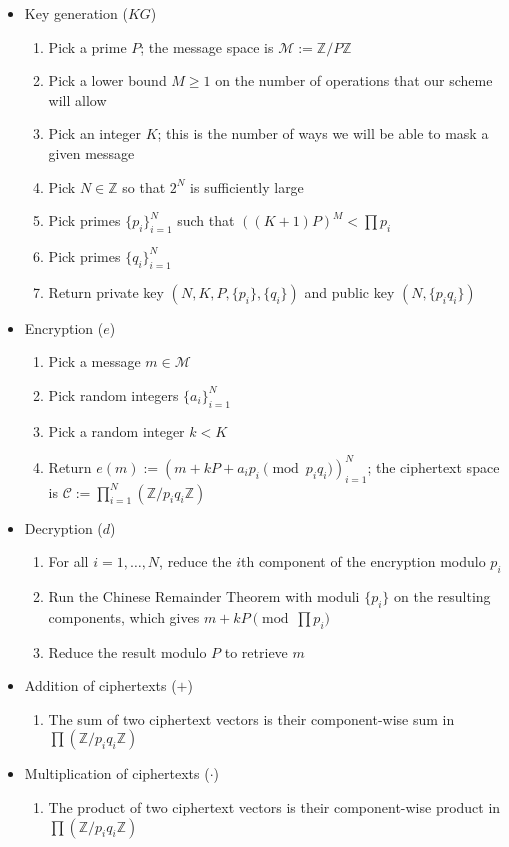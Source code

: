 \documentclass[11pt]{report}
\newcommand{\Z}{\mathbb{Z}}
\newcommand{\M}{\mathcal{M}}
\newcommand{\ZP}{\mathbb{Z}/P\mathbb{Z}}
\begin{document}
\begin{itemize}
\item Key generation ($KG$)
\begin{enumerate}
\item Pick a prime $P$; the message space is $\M := \ZP$
\item Pick a lower bound $M\geq 1$ on the number of operations that our scheme will allow
\item Pick an integer $K$; this is the number of ways we will be able to mask a given message
\item Pick $N\in \Z$ so that $2^N$ is sufficiently large
\item Pick primes $\{p_i\}_{i=1}^N$ such that $((K+1)P)^M<\prod p_i$
\item Pick primes $\{q_i\}_{i=1}^N$
\item Return private key $(N,K,P,\{p_i\},\{q_i\})$ and public key $(N,\{p_iq_i\})$
\end{enumerate}

\item Encryption ($e$)
\begin{enumerate}
\item Pick a message $m\in \M$
\item Pick random integers $\{a_i\}_{i=1}^N$
\item Pick a random integer $k<K$
\item Return $e(m):=(m+kP+a_ip_i \pmod{p_iq_i})_{i=1}^N$; the ciphertext space is $\mathcal{C} := \prod_{i=1}^N(\Z/p_iq_i\Z)$
\end{enumerate}

\item Decryption ($d$)
\begin{enumerate}
\item For all $i=1,\ldots,N$, reduce the $i$th component of the encryption modulo $p_i$
\item Run the Chinese Remainder Theorem with moduli $\{p_i\}$ on the resulting components, which gives $m+kP \pmod{\prod p_i}$
\item Reduce the result modulo $P$ to retrieve $m$
\end{enumerate}

\item Addition of ciphertexts ($+$)
\begin{enumerate}
\item The sum of two ciphertext vectors is their component-wise sum in $\prod (\Z/p_iq_i\Z)$
\end{enumerate}

\item Multiplication of ciphertexts ($\cdot$)
\begin{enumerate}
\item The product of two ciphertext vectors is their component-wise product in $\prod(\Z/p_iq_i\Z)$
\end{enumerate}
\end{itemize}
\end{document}
